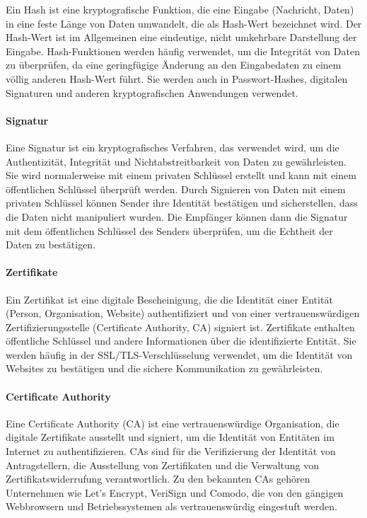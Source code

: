 Ein Hash ist eine kryptografische Funktion, die eine Eingabe (Nachricht, Daten) in eine feste Länge von Daten umwandelt, die als Hash-Wert bezeichnet wird. Der Hash-Wert ist im Allgemeinen eine eindeutige, nicht umkehrbare Darstellung der Eingabe. Hash-Funktionen werden häufig verwendet, um die Integrität von Daten zu überprüfen, da eine geringfügige Änderung an den Eingabedaten zu einem völlig anderen Hash-Wert führt. Sie werden auch in Passwort-Hashes, digitalen Signaturen und anderen kryptografischen Anwendungen verwendet.

\paragraph{Signatur}

Eine Signatur ist ein kryptografisches Verfahren, das verwendet wird, um die Authentizität, Integrität und Nichtabstreitbarkeit von Daten zu gewährleisten. Sie wird normalerweise mit einem privaten Schlüssel erstellt und kann mit einem öffentlichen Schlüssel überprüft werden. Durch Signieren von Daten mit einem privaten Schlüssel können Sender ihre Identität bestätigen und sicherstellen, dass die Daten nicht manipuliert wurden. Die Empfänger können dann die Signatur mit dem öffentlichen Schlüssel des Senders überprüfen, um die Echtheit der Daten zu bestätigen.

\paragraph{Zertifikate}

Ein Zertifikat ist eine digitale Bescheinigung, die die Identität einer Entität (Person, Organisation, Website) authentifiziert und von einer vertrauenswürdigen Zertifizierungsstelle (Certificate Authority, CA) signiert ist. Zertifikate enthalten öffentliche Schlüssel und andere Informationen über die identifizierte Entität. Sie werden häufig in der SSL/TLS-Verschlüsselung verwendet, um die Identität von Websites zu bestätigen und die sichere Kommunikation zu gewährleisten.

\paragraph{Certificate Authority}

Eine Certificate Authority (CA) ist eine vertrauenswürdige Organisation, die digitale Zertifikate ausstellt und signiert, um die Identität von Entitäten im Internet zu authentifizieren. CAs sind für die Verifizierung der Identität von Antragstellern, die Ausstellung von Zertifikaten und die Verwaltung von Zertifikatswiderrufung verantwortlich. Zu den bekannten CAs gehören Unternehmen wie Let's Encrypt, VeriSign und Comodo, die von den gängigen Webbrowsern und Betriebssystemen als vertrauenswürdig eingestuft werden.

